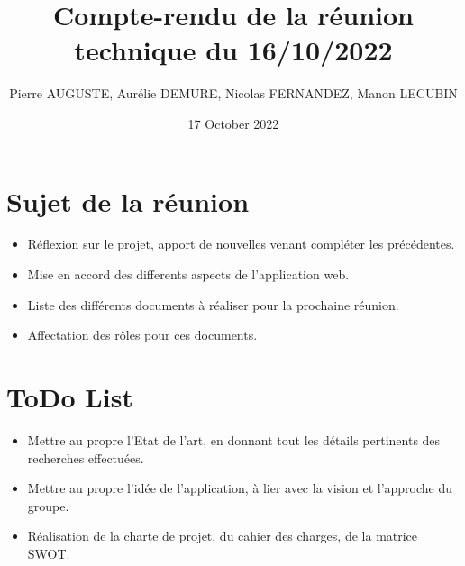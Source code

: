 \documentclass{article}
\title{Compte-rendu de la réunion technique du 16/10/2022}
\author{Pierre AUGUSTE, Aurélie DEMURE, Nicolas FERNANDEZ, Manon LECUBIN}
\date{17 October 2022}
\begin{document}
\maketitle

\section{Sujet de la réunion}

\begin{itemize}
    \item Réflexion sur le projet, apport de nouvelles venant compléter les précédentes.
    \item Mise en accord des differents aspects de l'application web.
    \item Liste des différents documents à réaliser pour la prochaine réunion.
    \item Affectation des rôles pour ces documents.
\end{itemize}

\section{ToDo List}
\begin{itemize}
    \item Mettre au propre l'Etat de l'art, en donnant tout les détails pertinents des recherches effectuées.
    \item Mettre au propre l'idée de l'application, à lier avec la vision et l'approche du groupe.
    \item Réalisation de la charte de projet, du cahier des charges, de la matrice SWOT.
\end{itemize}
\end{document}
